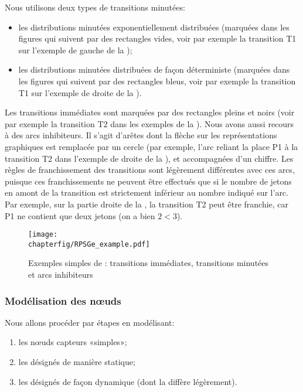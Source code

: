 Nous utilisons deux types de transitions minutées:
\begin{itemize}
    \item les distributions minutées exponentiellement distribuées (marquées dans les figures qui suivent par des rectangles vides, voir par exemple la transition \textsf{T1} sur l'exemple de gauche de la );
    \item les distributions minutées distribuées de façon déterministe (marquées dans les figures qui suivent par des rectangles bleus, voir par exemple la transition \textsf{T1} sur l'exemple de droite de la ).
\end{itemize}
Les transitions immédiates sont marquées par des rectangles pleins et noirs (voir par exemple la transition \textsf{T2} dans les exemples de la ).
Nous avons aussi recours à des arcs inhibiteurs.
Il s'agit d'arêtes dont la flèche sur les représentations graphiques est remplacée par un cercle (par exemple, l'arc reliant la place \textsf{P1} à la transition \textsf{T2} dans l'exemple de droite de la ), et accompagnées d'un chiffre.
Les règles de franchissement des transitions sont légèrement différentes avec ces arcs, puisque ces franchissements ne peuvent être effectués que si le nombre de jetons en amont de la transition est strictement inférieur au nombre indiqué sur l'arc.
Par exemple, sur la partie droite de la , la transition \textsf{T2} peut être franchie, car \textsf{P1} ne contient que deux jetons (on a bien $2<3$).
\begin{figure}[ht]
    \centering
    \texttt{[image: \\chapterfig/RPSGe\_example.pdf]}
    \caption{Exemples simples de \rpsge: transitions immédiates, transitions minutées et arcs inhibiteurs}\label{sa:fig:gspnex1}
\end{figure}

        \subsubsection{Modélisation des nœuds}
Nous allons procéder par étapes en modélisant:
\begin{enumerate}
    \item les nœuds capteurs «simples»;
    \item les \cns désignés de manière statique;
    \item les \cns désignés de façon dynamique (dont la  diffère légèrement).
\end{enumerate}

